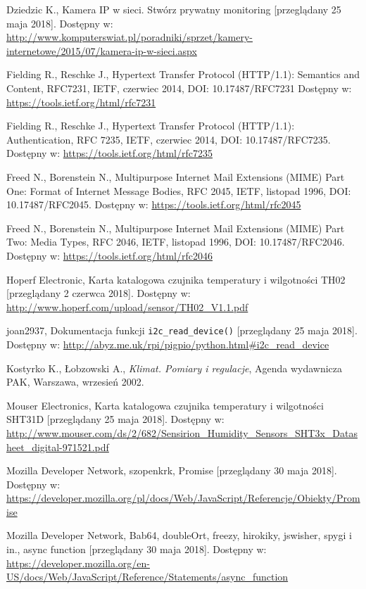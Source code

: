 \documentclass[a4paper,11pt,twoside]{article}
\begin{document}
\begin{thebibliography}{9}
Dziedzic K., Kamera IP w sieci. Stwórz prywatny monitoring [przeglądany 25 maja 2018].
Dostępny w: \url{http://www.komputerswiat.pl/poradniki/sprzet/kamery-internetowe/2015/07/kamera-ip-w-sieci.aspx}

Fielding R., Reschke J., Hypertext Transfer Protocol (HTTP/1.1): Semantics and Content, RFC7231, IETF, czerwiec 2014, DOI: 10.17487/RFC7231
Dostępny w: \url{https://tools.ietf.org/html/rfc7231}

Fielding R., Reschke J., Hypertext Transfer Protocol (HTTP/1.1): Authentication, RFC 7235, IETF, czerwiec 2014, DOI: 10.17487/RFC7235.
Dostępny w: \url{https://tools.ietf.org/html/rfc7235}

Freed N., Borenstein N., Multipurpose Internet Mail Extensions (MIME) Part One: Format of Internet Message Bodies, RFC 2045, IETF, listopad 1996, DOI: 10.17487/RFC2045.
Dostępny w: \url{https://tools.ietf.org/html/rfc2045}

Freed N., Borenstein N., Multipurpose Internet Mail Extensions (MIME) Part Two: Media Types, RFC 2046, IETF, listopad 1996, DOI: 10.17487/RFC2046.
Dostępny w: \url{https://tools.ietf.org/html/rfc2046}

Hoperf Electronic, Karta katalogowa czujnika temperatury i wilgotności TH02 [przeglądany 2 czerwca 2018].
Dostępny w: \url{http://www.hoperf.com/upload/sensor/TH02_V1.1.pdf}

joan2937, Dokumentacja funkcji \texttt{i2c{\_}read{\_}device()} [przeglądany 25 maja 2018].
Dostępny w: \url{http://abyz.me.uk/rpi/pigpio/python.html#i2c_read_device}

Kostyrko K., Łobzowski A., \textit{Klimat. Pomiary i regulacje}, Agenda wydawnicza PAK, Warszawa, wrzesień 2002.

Mouser Electronics, Karta katalogowa czujnika temperatury i wilgotności SHT31D [przeglądany 25 maja 2018].
Dostępny w: \url{http://www.mouser.com/ds/2/682/Sensirion_Humidity_Sensors_SHT3x_Datasheet_digital-971521.pdf}

Mozilla Developer Network, szopenkrk, Promise [przeglądany 30 maja 2018].
Dostępny w: \url{https://developer.mozilla.org/pl/docs/Web/JavaScript/Referencje/Obiekty/Promise}

Mozilla Developer Network, Bab64, doubleOrt, freezy, hirokiky, jswisher, spygi i in., async function [przeglądany 30 maja 2018].
Dostępny w: \url{https://developer.mozilla.org/en-US/docs/Web/JavaScript/Reference/Statements/async_function}


\end{thebibliography}
\end{document}
